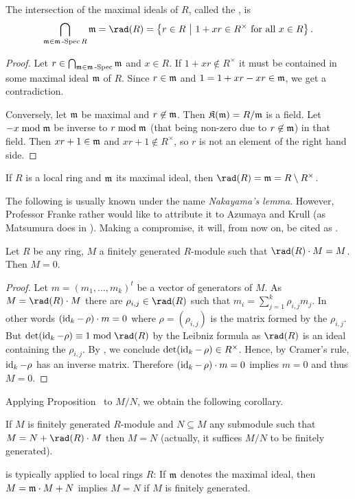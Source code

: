 \documentclass[a4paper,parskip=half,numbers=enddot, DIV=12]{scrreprt}
\begin{document}
\begin{prop}
    The intersection of the maximal ideals of $R$, called the , is
    \begin{align}\lbl{eq:JacobsonRadical}
        \bigcap_{\mm \in\mSpec R} \mm = \rad(R) = \left\{r\in R\st1+xr\in R^\times \text{ for all } x\in R\right\}.
    \end{align}
\end{prop}
\begin{proof}
    Let $r\in \bigcap_{\mathfrak{m}\in\mathfrak{m}\operatorname{-Spec}} \mathfrak{m}$ and $x\in R$. If $1+xr\not\in R^\times$ it must be contained in some maximal ideal $\mathfrak{m}$ of $R$. Since $r\in\mathfrak{m}$ and $1 = 1+xr - xr\in\mathfrak{m}$, we get a contradiction. 
    
    Conversely, let $\mathfrak{m}$ be maximal and $r\not\in\mathfrak{m}$. Then $\mathfrak{K}(\mathfrak{m}) = R/\mathfrak{m}$ is a field. Let $-x\bmod \mathfrak{m}$ be inverse to $r\bmod\mathfrak{m}$ (that being non-zero due to $r\not\in\mathfrak{m}$) in that field. Then $xr+1\in\mathfrak{m}$ and $xr+1\not\in R^\times$, so $r$ is not an element of the right hand side.
\end{proof}
\begin{example}
    If $R$ is a local ring and $\mathfrak{m}$ its maximal ideal, then $\rad (R) = \mm = R\setminus R^\times$.
\end{example}
The following is usually known under the name \emph{Nakayama's lemma}. However, Professor Franke rather would like to attribute it to Azumaya and Krull (as Matsumura does in \cite{matsumuraCRT}). Making a compromise, it will, from now on, be cited as \NAK.
\begin{prop}
        Let $R$ be any ring, $M$ a finitely generated $R$-module such that $\rad(R)\cdot M = M$. Then $M=0$.
\end{prop}
\begin{proof}
    Let $m=(m_1,\ldots,m_k)^t$ be a vector of generators of $M$. As $M=\rad(R) \cdot M$ there are $\rho_{i,j}\in\rad(R)$ such that $m_i = \sum_{j=1}^k \rho_{i,j} m_j$. In other words $(\operatorname{id}_k -\,\rho)\cdot m=0$ where $\rho=(\rho_{i,j})$ is the matrix formed by the $\rho_{i,j}$. But $\det(\id_k - \rho) \equiv 1\bmod \rad(R)$ by the Leibniz formula as $\rad(R)$ is an ideal containing the $\rho_{i,j}$. By , we conclude $\operatorname{det}(\operatorname{id}_k -\,\rho)\in R^\times$. Hence, by Cramer's rule, $\operatorname{id}_k-\rho$ has an inverse matrix. Therefore $(\operatorname{id}_k -\,\rho) \cdot m = 0$ implies $m=0$ and thus $M=0$.
\end{proof}
Applying Proposition~ to $M/N$, we obtain the following corollary.
\begin{cor}
    If $M$ is finitely generated $R$-module and $N\subseteq M$ any submodule such that $M = N+\rad(R)\cdot M$ then $M=N$ (actually, it suffices $M/N$ to be finitely generated).
\end{cor}
\begin{rem*}
    {\NAK} is typically applied to local rings $R$: If $\mathfrak{m}$ denotes the maximal ideal, then $M= \mathfrak{m}\cdot M +N$ implies $M=N$ if $M$ is finitely generated.
\end{rem*}
\end{document}
